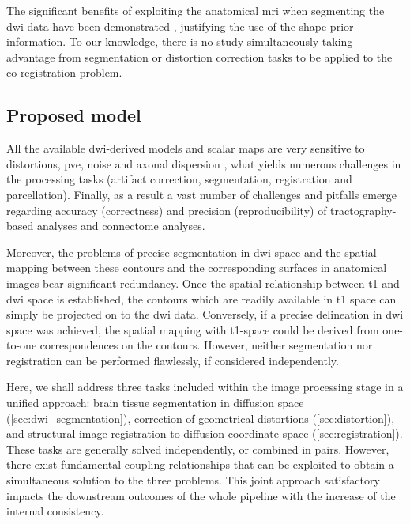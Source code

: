 The significant benefits of exploiting the anatomical \gls{mri} when
segmenting the \gls{dwi} data have been demonstrated \cite{zoellei_improved_2010},
justifying the use of the shape prior information.
To our knowledge, there is
no study simultaneously taking advantage from segmentation or distortion correction
tasks to be applied to the co-registration problem.

\subsection{Proposed model}
\label{sec:contributions}

All the available \gls{dwi}-derived models and scalar maps
are very sensitive to distortions, \gls{pve}, noise and axonal dispersion
\citep{jbabdi_tractography_2011}, what yields numerous challenges in the
processing tasks (artifact correction, segmentation, registration and
parcellation).
Finally, as a result a vast number of challenges and pitfalls
emerge regarding accuracy (correctness) and precision (reproducibility) of
tractography-based analyses \citep{jones_white_2013} and connectome
analyses.

Moreover, the problems of precise segmentation in \gls{dwi}-space and the
spatial mapping between these contours and the corresponding surfaces in
anatomical images bear significant redundancy.
Once the spatial relationship
between \gls{t1} and \gls{dwi} space is established, the contours which are
readily available in \gls{t1} space can simply be projected on to the
\gls{dwi} data.
Conversely, if a precise delineation in \gls{dwi} space
was achieved, the spatial mapping with \gls{t1}-space could be derived
from one-to-one correspondences on the contours.
However, neither segmentation
nor registration can be performed flawlessly, if considered independently.

Here, we shall address three tasks included within  the image processing stage in
a unified approach: brain tissue segmentation in diffusion space
(\autoref{sec:dwi_segmentation}),
correction of geometrical distortions (\autoref{sec:distortion}), and structural
image registration to diffusion coordinate space (\autoref{sec:registration}).
These tasks are generally
solved independently, or combined in pairs.
However, there exist fundamental
coupling relationships that can be exploited to obtain a simultaneous solution to
the three problems.
This joint approach satisfactory impacts the downstream
outcomes of the whole pipeline with the increase of the internal consistency.

